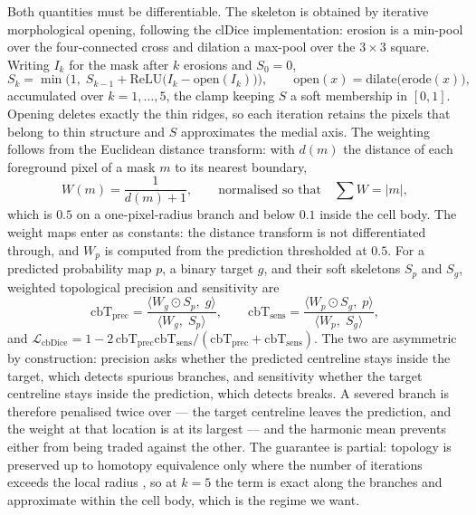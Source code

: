Both quantities must be differentiable. The skeleton is obtained by
iterative morphological opening, following the clDice implementation:
erosion is a min-pool over the four-connected cross and dilation a max-pool
over the $3\times3$ square. Writing $I_k$ for the mask after $k$ erosions
and $S_0 = 0$,
\begin{equation}
S_k = \min\!\Big(1,\; S_{k-1} + \mathrm{ReLU}\!\big(I_k - \mathrm{open}(I_k)\big)\Big),
\qquad
\mathrm{open}(x) = \mathrm{dilate}\big(\mathrm{erode}(x)\big),
\label{eq:skel}
\end{equation}
accumulated over $k = 1,\dots,5$, the clamp keeping $S$ a soft membership in
$[0,1]$. Opening deletes exactly the thin ridges, so each iteration retains
the pixels that belong to thin structure and $S$ approximates the medial
axis. The weighting follows from the Euclidean distance transform: with
$d(m)$ the distance of each foreground pixel of a mask $m$ to its nearest
boundary,
\begin{equation}
W(m) = \frac{1}{d(m) + 1},
\qquad\text{normalised so that}\quad \textstyle\sum W = |m| ,
\label{eq:edtweight}
\end{equation}
which is $0.5$ on a one-pixel-radius branch and below $0.1$ inside the cell
body. The weight maps enter as constants: the distance transform is not
differentiated through, and $W_p$ is computed from the prediction
thresholded at $0.5$. For a predicted probability map $p$, a binary target
$g$, and their soft skeletons $S_p$ and $S_g$, weighted topological
precision and sensitivity are
\begin{equation}
\mathrm{cbT}_{\text{prec}}
 = \frac{\langle W_g \odot S_p,\; g \rangle}{\langle W_g,\; S_p \rangle},
\qquad
\mathrm{cbT}_{\text{sens}}
 = \frac{\langle W_p \odot S_g,\; p \rangle}{\langle W_p,\; S_g \rangle},
\label{eq:cbdice}
\end{equation}
and $\mathcal{L}_{\text{cbDice}} = 1 - 2\,\mathrm{cbT}_{\text{prec}}
\mathrm{cbT}_{\text{sens}} / (\mathrm{cbT}_{\text{prec}} +
\mathrm{cbT}_{\text{sens}})$. The two are asymmetric by construction:
precision asks whether the predicted centreline stays inside the target,
which detects spurious branches, and sensitivity whether the target
centreline stays inside the prediction, which detects breaks. A severed
branch is therefore penalised twice over --- the target centreline leaves
the prediction, and the weight at that location is at its largest --- and
the harmonic mean prevents either from being traded against the other. The
guarantee is partial: topology is preserved up to homotopy equivalence only
where the number of iterations exceeds the local radius
\cite{grim2025supervoxel}, so at $k = 5$ the term is exact along the
branches and approximate within the cell body, which is the regime we want.

